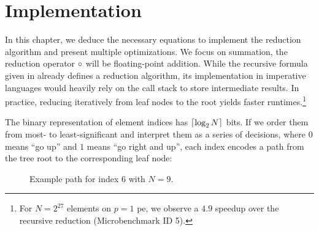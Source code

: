 \chapter{Implementation}
\label{ch:Implementation}

In this chapter, we deduce the necessary equations to implement the reduction algorithm and present multiple optimizations.
We focus on summation, the reduction operator $\operatorname{\circ}$ will be floating-point addition.
While the recursive formula given in  already defines a reduction algorithm, its implementation in imperative languages would heavily rely on the call stack to store intermediate results.
In practice, reducing iteratively from leaf nodes to the root yields faster runtimes.\footnote{For $N=2^{27}$ elements on $p=1$ \gls{pe}, we observe a $4.9$ speedup over the recursive reduction (Microbenchmark ID 5).}

The binary representation of element indices has $\lceil \log_2 N \rceil$ bits.
If we order them from most- to least-significant and interpret them as a series of decisions, where $0$ means \enquote{go up} and $1$ means \enquote{go right and up}, each index encodes a path from the tree root to the corresponding leaf node:

\begin{figure}[H]
\centering
{}
\caption{Example path for index $6$ with $N = 9$.}
\label{fig:indexTreePath}
\end{figure}

